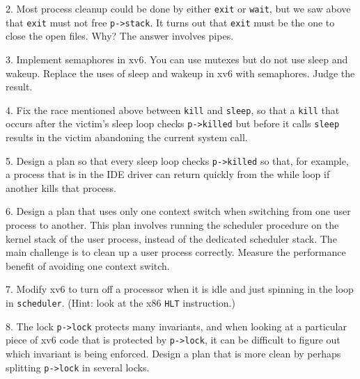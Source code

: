 2. Most process cleanup could be done by either
\lstinline{exit}
or
\lstinline{wait},
but we saw above that
\lstinline{exit}
must not free
\lstinline{p->stack}.
It turns out that
\lstinline{exit}
must be the one to close the open files.
Why?
The answer involves pipes.

3. Implement semaphores in xv6.
You can use mutexes but do not use sleep and wakeup.
Replace the uses of sleep and wakeup in xv6
with semaphores.  Judge the result.

4. Fix the race mentioned above between
\lstinline{kill}
and 
\lstinline{sleep},
so that a
\lstinline{kill}
that occurs after the victim's sleep loop checks
\lstinline{p->killed}
but before it calls
\lstinline{sleep}
results in the victim abandoning the current system call.

5. Design a plan so that every sleep loop checks 
\lstinline{p->killed}
so that, for example, a process that is in the IDE driver can return quickly from the while loop
if another kills that process.

6. Design a plan that uses only one context switch when switching from one user
process to another.  This plan involves running the scheduler procedure on the
kernel stack of the user process, instead of the dedicated scheduler stack.  The
main challenge is to clean up a user process correctly.  Measure the performance
benefit of avoiding one context switch.

7. Modify xv6 to turn off a processor when it is idle and just spinning in the
loop in
\lstinline{scheduler}.
(Hint: look at the x86
\lstinline{HLT}
instruction.)

8. The lock
\lstinline{p->lock}
protects many invariants, and when looking at a particular piece of xv6 code that
is protected by
\lstinline{p->lock},
it can be difficult to figure out which invariant is being enforced.  Design a
plan that is more clean by perhaps splitting
\lstinline{p->lock}
in several locks.
